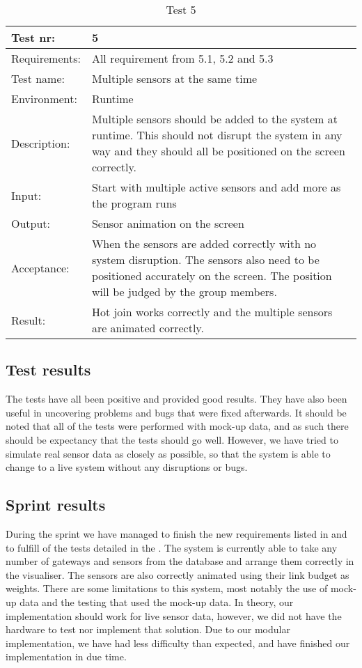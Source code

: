 \documentclass[../document]{subfiles}
\begin{document}
\begin{table}[H]
\caption{Test 5}
\centering
\begin{tabularx}{\textwidth}{|l|X|}
\hline
Test nr:
&5
\\ \hline Requirements:
&All requirement from 5.1, 5.2 and 5.3
\\ \hline Test name:
&Multiple sensors at the same time
\\ \hline Environment:
&Runtime
\\ \hline Description:
&Multiple sensors should be added to the system at runtime. This should not disrupt the system in any way and they should all be positioned on the screen correctly.
\\ \hline Input:
&Start with multiple active sensors and add more as the program runs
\\ \hline Output:
&Sensor animation on the screen
\\ \hline Acceptance:
&When the sensors are added correctly with no system disruption. The sensors also need to be positioned accurately on the screen. The position will be judged by the group members.
\\ \hline Result:
&Hot join works correctly and the multiple sensors are animated correctly.
\\ \hline 
\end{tabularx}
\end{table}


\subsection{Test results}

The tests have all been positive and provided good results. They have also been useful in uncovering problems and bugs that were fixed afterwards. It should be noted that all of the tests were performed with mock-up data, and as such there should be expectancy that the tests should go well. However, we have tried to simulate real sensor data as closely as possible, so that the system is able to change to a live system without any disruptions or bugs. 

\subsection{Sprint results}

During the sprint we have managed to finish the new requirements listed in  and to fulfill of the tests detailed in the . The system is currently able to take any number of gateways and sensors from the database and arrange them correctly in the visualiser. The sensors are also correctly animated using their link budget as weights. There are some limitations to this system, most notably the use of mock-up data and the testing that used the mock-up data. In theory, our implementation should work for live sensor data, however, we did not have the hardware to test nor implement that solution. Due to our modular implementation, we have had less difficulty than expected, and have finished our implementation in due time.
\end{document}
